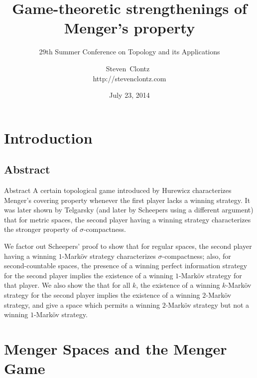 \documentclass{beamer}
\title
{Game-theoretic strengthenings of Menger's property}
\subtitle
{29th Summer Conference on Topology and its Applications} %
\author%
{Steven~Clontz~\\http://stevenclontz.com}%
\institute[Auburn University] %
{
  Department of Mathematics and Statistics\\
  Auburn University}
\date[14-07-23] %
{July 23, 2014}
\theoremstyle{definition}
\newcommand{\<}{\langle}
\renewcommand{\>}{\rangle}
\begin{document}
\renewcommand{\pause}{}
\newcommand{\vpause}{\pause\vspace{1em}}

\begin{frame}
  \titlepage
\end{frame}



\section{Introduction}

\subsection{Abstract}

\begin{frame}{Abstract}%
    \small
    A certain topological game introduced by Hurewicz characterizes Menger's
    covering property whenever the first player lacks a winning strategy. It
    was later shown by Telgarsky (and later by Scheepers using a different
    argument) that for metric spaces, the second player having a winning
    strategy characterizes the stronger property of $\sigma$-compactness.

    \vspace{1em}

    We factor out Scheepers' proof to show
    that for regular spaces, the second player having a winning $1$-Mark\"ov
    strategy characterizes $\sigma$-compactness; also, for second-countable
    spaces, the presence of a winning perfect information strategy for the
    second player implies the existence of a winning $1$-Mark\"ov strategy for
    that player. We also show the that for all $k$, the existence of a
    winning $k$-Mark\"ov strategy for the second player implies the existence
    of a winning $2$-Mark\"ov strategy, and give a space which permits
    a winning $2$-Mark\"ov strategy but not a winning $1$-Mark\"ov strategy.
\end{frame}

\section{Menger Spaces and the Menger Game}
\end{document}
